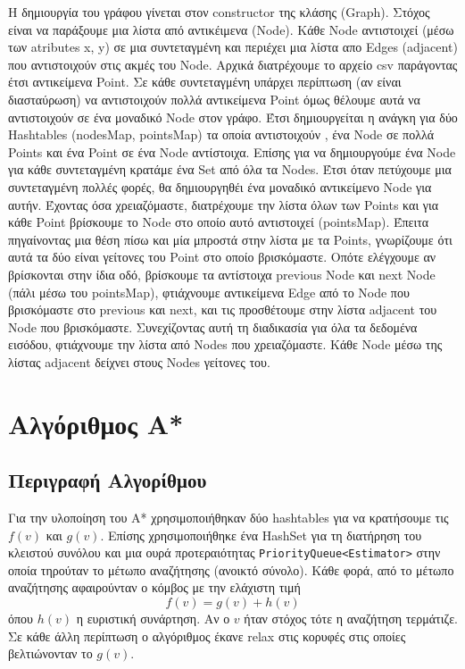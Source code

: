 \documentclass[a4paper,oneside,12pt]{article}
\begin{document}
Η δημιουργία του γράφου γίνεται στον constructor της κλάσης (Graph). Στόχος είναι να παράξουμε μια λίστα από αντικέιμενα (Node). Κάθε Node αντιστοιχεί (μέσω των atributes x, y) σε μια συντεταγμένη και περιέχει μια λίστα απο Edges (adjacent) που αντιστοιχούν στις ακμές του Node. Αρχικά διατρέχουμε το αρχείο csv παράγοντας έτσι αντικείμενα Point. Σε κάθε συντεταγμένη υπάρχει περίπτωση (αν είναι διασταύρωση) να αντιστοιχούν πολλά αντικείμενα Point όμως θέλουμε αυτά να αντιστοιχούν σε ένα μοναδικό Node στον γράφο. Έτσι δημιουργείται η ανάγκη για δύο Hashtables (nodesMap, pointsMap) τα οποία αντιστοιχούν , ένα Node σε πολλά Points και ένα Point σε ένα Node αντίστοιχα. Επίσης για να δημιουργούμε ένα Node για κάθε συντεταγμένη κρατάμε ένα Set από όλα τα Nodes. Έτσι όταν πετύχουμε μια συντεταγμένη πολλές φορές, θα δημιουργηθέι ένα μοναδικό αντικείμενο Node για αυτήν. Έχοντας όσα χρειαζόμαστε, διατρέχουμε την λίστα όλων των Points και για κάθε Point βρίσκουμε το Node στο οποίο αυτό αντιστοιχεί (pointsMap). Έπειτα πηγαίνοντας μια θέση πίσω και μία μπροστά στην λίστα με τα Points, γνωρίζουμε ότι αυτά τα δύο είναι γείτονες του Point στο οποίο βρισκόμαστε. Οπότε ελέγχουμε αν βρίσκονται στην ίδια οδό, βρίσκουμε τα αντίστοιχα previous Node και next Node (πάλι μέσω του pointsMap), φτιάχνουμε αντικείμενα Edge από το Node που βρισκόμαστε στο previous και next, και τις προσθέτουμε στην λίστα adjacent του Node που βρισκόμαστε. Συνεχίζοντας αυτή τη διαδικασία για όλα τα δεδομένα εισόδου, φτιάχνουμε την λίστα από Nodes που χρειαζόμαστε. Κάθε Node μέσω της λίστας adjacent δείχνει στους Nodes γείτονες του.

\section{Αλγόριθμος Α*}

\subsection{Περιγραφή Αλγορίθμου}
Για την υλοποίηση του Α* χρησιμοποιήθηκαν δύο hashtables για να κρατήσουμε τις $f(v)$ και $g(v)$. Επίσης χρησιμοποιήθηκε ένα HashSet για τη διατήρηση του κλειστού συνόλου και μια ουρά προτεραιότητας \texttt{PriorityQueue<Estimator>} στην οποία τηρούταν το μέτωπο αναζήτησης (ανοικτό σύνολο). Κάθε φορά, από το μέτωπο αναζήτησης αφαιρούνταν ο κόμβος με την ελάχιστη τιμή $$f(v) = g(v) + h(v)$$ όπου $h(v)$ η ευριστική συνάρτηση. Αν ο $v$ ήταν στόχος τότε η αναζήτηση τερμάτιζε. Σε κάθε άλλη περίπτωση ο αλγόριθμος έκανε relax στις κορυφές στις οποίες βελτιώνονταν το $g(v)$. 
\end{document}
